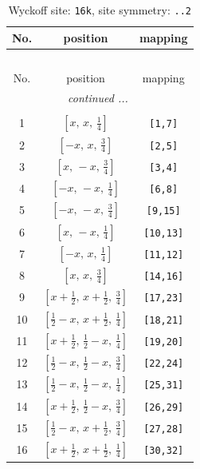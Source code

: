 \documentclass[fleqn,8pt]{jsarticle}
\begin{document}
\begin{longtable}{ccc}
\caption{Wyckoff site: {\tt 16k}, site symmetry: {\tt ..2}}
 \\
 \hline \hline
No. & position & mapping \\ \hline \endfirsthead

\multicolumn{2}{l}{\tablename\ \thetable{}} \\
 \hline \hline
No. & position & mapping \\ \hline \endhead

 \hline \hline
\multicolumn{2}{r}{\footnotesize\it continued ...} \\ \endfoot

 \hline \hline
\multicolumn{2}{r}{} \\ \endlastfoot

1 & $\left[ x,\, x,\, \frac{1}{4} \right]$ & {\tt [1,7]} \\ \hline
2 & $\left[ - x,\, x,\, \frac{3}{4} \right]$ & {\tt [2,5]} \\ \hline
3 & $\left[ x,\, - x,\, \frac{3}{4} \right]$ & {\tt [3,4]} \\ \hline
4 & $\left[ - x,\, - x,\, \frac{1}{4} \right]$ & {\tt [6,8]} \\ \hline
5 & $\left[ - x,\, - x,\, \frac{3}{4} \right]$ & {\tt [9,15]} \\ \hline
6 & $\left[ x,\, - x,\, \frac{1}{4} \right]$ & {\tt [10,13]} \\ \hline
7 & $\left[ - x,\, x,\, \frac{1}{4} \right]$ & {\tt [11,12]} \\ \hline
8 & $\left[ x,\, x,\, \frac{3}{4} \right]$ & {\tt [14,16]} \\ \hline
9 & $\left[ x + \frac{1}{2},\, x + \frac{1}{2},\, \frac{3}{4} \right]$ & {\tt [17,23]} \\ \hline
10 & $\left[ \frac{1}{2} - x,\, x + \frac{1}{2},\, \frac{1}{4} \right]$ & {\tt [18,21]} \\ \hline
11 & $\left[ x + \frac{1}{2},\, \frac{1}{2} - x,\, \frac{1}{4} \right]$ & {\tt [19,20]} \\ \hline
12 & $\left[ \frac{1}{2} - x,\, \frac{1}{2} - x,\, \frac{3}{4} \right]$ & {\tt [22,24]} \\ \hline
13 & $\left[ \frac{1}{2} - x,\, \frac{1}{2} - x,\, \frac{1}{4} \right]$ & {\tt [25,31]} \\ \hline
14 & $\left[ x + \frac{1}{2},\, \frac{1}{2} - x,\, \frac{3}{4} \right]$ & {\tt [26,29]} \\ \hline
15 & $\left[ \frac{1}{2} - x,\, x + \frac{1}{2},\, \frac{3}{4} \right]$ & {\tt [27,28]} \\ \hline
16 & $\left[ x + \frac{1}{2},\, x + \frac{1}{2},\, \frac{1}{4} \right]$ & {\tt [30,32]} \\
\end{longtable}
\end{document}
